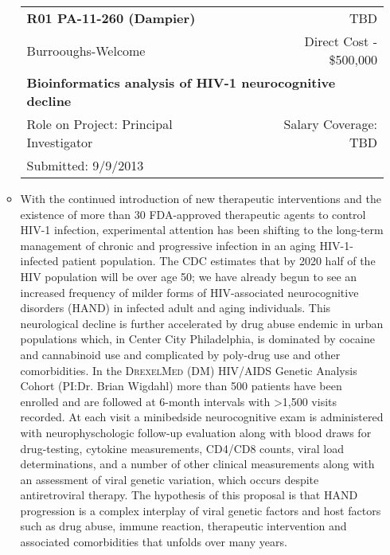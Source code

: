 \documentclass[a4paper,11pt]{article}
\makeatletter
\newenvironment{fullwidth}
    {\par
     \setlength{\@totalleftmargin}{0pt}%
     \setlength{\linewidth}{\hsize}%
     \list{}{\setlength{\leftmargin}{0pt}}
     \item\relax}
    {\endlist}
\makeatother
\begin{document}
\begin{enumerate}
\begin{itemize}
     \begin{longtable}{lr}
    \textbf{R01 PA-11-260 (Dampier)} & TBD \\
    Burrooughs-Welcome & Direct Cost - \$500,000 \\
    \multicolumn{2}{p{0.973\textwidth}}{\bfseries Bioinformatics analysis of HIV-1 neurocognitive decline} \\
    Role on Project:  Principal Investigator & Salary Coverage: TBD \\
    Submitted: 9/9/2013\\
    \end{longtable}
    \begin{fullwidth}
     With the continued introduction of new therapeutic interventions and the existence of more than 30 FDA-approved therapeutic agents to control HIV-1 infection, experimental attention has been shifting to the long-term management of chronic and progressive infection in an aging HIV-1-infected patient population. 
The CDC estimates that by 2020 half of the HIV population will be over age 50; we have already begun to see an increased frequency of milder forms of HIV-associated neurocognitive disorders (HAND) in infected adult and aging individuals. 
This neurological decline is further accelerated by drug abuse endemic in urban populations which, in Center City Philadelphia, is dominated by cocaine and cannabinoid use and complicated by poly-drug use and other comorbidities. 
In the \textsc{DrexelMed} (DM) HIV/AIDS Genetic Analysis Cohort (PI:Dr. 
Brian Wigdahl) more than 500 patients have been enrolled and are followed at 6-month intervals with >1,500 visits recorded. 
At each visit a minibedside neurocognitive exam is administered with neurophyschologic follow-up evaluation along with blood draws for drug-testing, cytokine measurements, CD4/CD8 counts, viral load determinations, and a number of other clinical measurements along with an assessment of viral genetic variation, which occurs despite antiretroviral therapy. 
The hypothesis of this proposal is that HAND progression is a complex interplay of viral genetic factors and host factors such as drug abuse, immune reaction, therapeutic intervention and associated comorbidities that unfolds over many years. 

    \end{fullwidth}


\end{itemize}
\end{enumerate}
\end{document}
